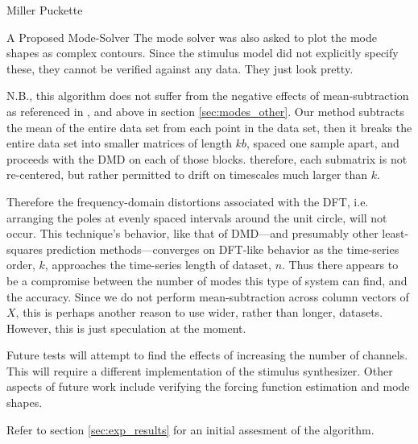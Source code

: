 \documentclass[a4paper,10pt]{report}
\numberwithin{equation}{section}
\begin{document}
\begin{chapter}{Miller Puckette}
\begin{section}{A Proposed Mode-Solver}
The mode solver was also asked to plot the mode shapes as complex contours. Since the stimulus model did not explicitly specify these, they cannot be verified against any data. They just look pretty.

N.B., this algorithm does not suffer from the negative effects of mean-subtraction as referenced in \cite{Chen2012}, and above in section \ref{sec:modes_other}. Our method subtracts the mean of the entire data set from each point in the data set, then it breaks the entire data set into smaller matrices of length $kb$, spaced one sample apart, and proceeds with the DMD on each of those blocks. therefore, each submatrix is not re-centered, but rather permitted to drift on timescales much larger than $k$.

Therefore the frequency-domain distortions associated with the DFT, i.e. arranging the poles at evenly spaced intervals around the unit circle, will not occur. This technique's behavior, like that of DMD---and presumably other least-squares prediction methods---converges on DFT-like behavior as the time-series order, $k$, approaches the time-series length of dataset, $n$. Thus there appears to be a compromise between the number of modes this type of system can find, and the accuracy. Since we do not perform mean-subtraction across column vectors of $X$, this is perhaps another reason to use wider, rather than longer, datasets. However, this is just speculation at the moment.

Future tests will attempt to find the effects of increasing the number of channels. This will require a different implementation of the stimulus synthesizer. Other aspects of future work include verifying the forcing function estimation and mode shapes. 

Refer to section \ref{sec:exp_results} for an initial assesment of the algorithm.
\end{section}
\end{chapter}
\end{document}
